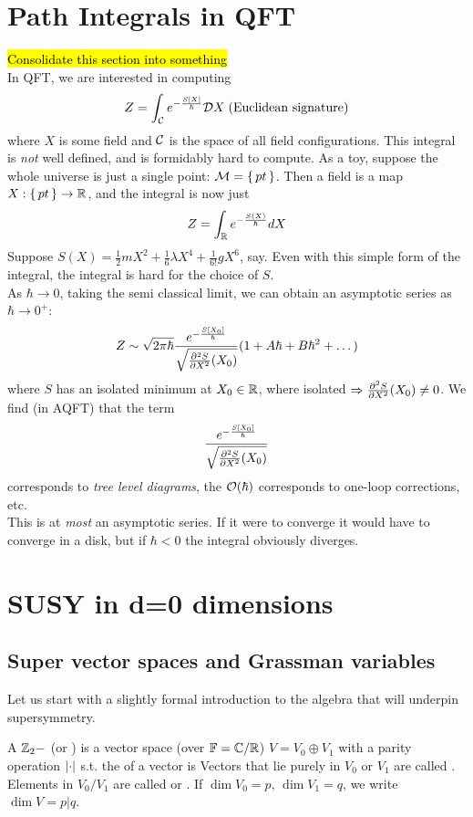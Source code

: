 \documentclass{article}
\begin{document}
\section{Path Integrals in QFT}
\hl{Consolidate this section into something} \\
In QFT, we are interested in computing 
\[
Z = \int_\mc{C} e^{-\frac{S[X]}{\hbar}} \mc{D}X \; \text{(Euclidean signature)}
\]
where $X$ is some field and $\mc{C}$ is the space of all field configurations. This integral is \emph{not} well defined, and is formidably hard to compute. 
As a toy, suppose the whole universe is just a single point: $\mc{M} = \set{pt}$. Then a field is a map $X:\set{pt} \to \mbb{R}$, and the integral is now just 
\[
Z = \int_\mbb{R} e^{-\frac{S(X)}{\hbar}} dX
\]
Suppose $S(X) = \frac{1}{2}mX^2 + \frac{1}{6}\lambda X^4 +\frac{1}{6!} gX^6$, say. Even with this simple form of the integral, the integral is hard for the choice of $S$. \\
As $\hbar \to 0$, taking the semi classical limit, we can obtain an asymptotic series as $\hbar \to 0^+$: 
\[
Z \sim \sqrt{2\pi\hbar}\frac{e^{-\frac{S[X_0]}{\hbar}}}{\sqrt{\pds[S]{X}(X_0)}}(1+A\hbar + B\hbar^2+\dots)
\]
where $S$ has an isolated minimum at $X_0\in\mbb{R}$, where isolated $\Rightarrow \pds[S]{X}(X_0) \neq0$. We find (in AQFT) that the term \[
\frac{e^{-\frac{S[X_0]}{\hbar}}}{\sqrt{\pds[S]{X}(X_0)}}
\]
corresponds to \emph{tree level diagrams}, the $\mc{O}(\hbar)$ corresponds to one-loop corrections, etc. \\
This is at \emph{most} an asymptotic series. If it were to converge it would have to converge in a disk, but if $\hbar < 0$ the integral obviously diverges. 

\section{SUSY in d=0 dimensions}
\subsection{Super vector spaces and Grassman variables}
Let us start with a slightly formal introduction to the algebra that will underpin supersymmetry. 

\begin{definition}
	A $\mbb{Z}_2-$ (or ) is a vector space (over $\mbb{F}= \mbb{C}/\mbb{R}$) $V = V_0 \oplus V_1$ with a parity operation $\abs{\cdot}$  s.t. the  of a vector is 
Vectors that lie purely in $V_0$ or $V_1$ are called . Elements in $V_0 / V_1$ are called  or . If $\dim V_{0}=p, \, \dim V_1 = q$, we write $\dim V = p | q$.
\end{definition}
\end{document}
